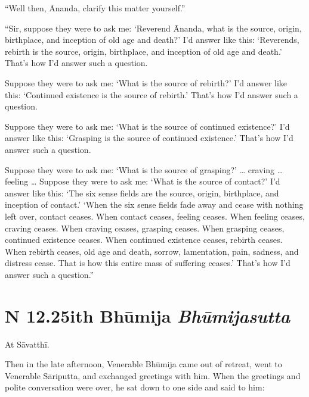 \documentclass[12pt,openany]{book}%
\newcommand*{\suttatitleacronym}[1]{\smaller[2]{#1}\vspace*{.3em}}
\newcommand*{\suttatitletranslation}[1]{\linebreak{#1}}
\newcommand*{\suttatitleroot}[1]{\linebreak\smaller[2]\itshape{#1}}
\newcommand*{\tocacronym}[1]{\hspace*{-3.3em}{#1}\quad}
\newcommand*{\toctranslation}[1]{#1}
\newcommand*{\tocroot}[1]{(\textit{#1})}
\begin{document}
“Well then, Ānanda, clarify this matter yourself.” 

“Sir, suppose they were to ask me: ‘Reverend Ānanda, what is the source, origin, birthplace, and inception of old age and death?’ I’d answer like this: ‘Reverends, rebirth is the source, origin, birthplace, and inception of old age and death.’ That’s how I’d answer such a question. 

Suppose they were to ask me: ‘What is the source of rebirth?’ I’d answer like this: ‘Continued existence is the source of rebirth.’ That’s how I’d answer such a question. 

Suppose they were to ask me: ‘What is the source of continued existence?’ I’d answer like this: ‘Grasping is the source of continued existence.’ That’s how I’d answer such a question. 

Suppose they were to ask me: ‘What is the source of grasping?’ … craving … feeling … Suppose they were to ask me: ‘What is the source of contact?’ I’d answer like this: ‘The six sense fields are the source, origin, birthplace, and inception of contact.’ ‘When the six sense fields fade away and cease with nothing left over, contact ceases. When contact ceases, feeling ceases. When feeling ceases, craving ceases. When craving ceases, grasping ceases. When grasping ceases, continued existence ceases. When continued existence ceases, rebirth ceases. When rebirth ceases, old age and death, sorrow, lamentation, pain, sadness, and distress cease. That is how this entire mass of suffering ceases.’ That’s how I’d answer such a question.” 

%
\section*{{\suttatitleacronym SN 12.25}{\suttatitletranslation With Bhūmija }{\suttatitleroot Bhūmijasutta}}
\addcontentsline{toc}{section}{\tocacronym{SN 12.25} \toctranslation{With Bhūmija } \tocroot{Bhūmijasutta}}

At \textsanskrit{Sāvatthī}. 

Then in the late afternoon, Venerable \textsanskrit{Bhūmija} came out of retreat, went to Venerable \textsanskrit{Sāriputta}, and exchanged greetings with him. When the greetings and polite conversation were over, he sat down to one side and said to him: 
\end{document}
